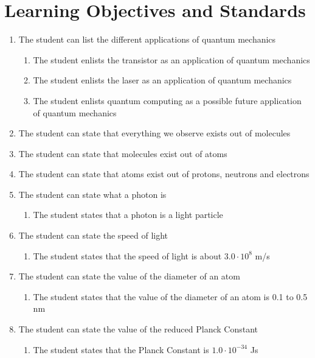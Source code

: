 \documentclass[11pt,twoside]{report} %
\begin{document}
\newpage

\section{Learning Objectives and Standards}
\label{app:objectivestandards}

\begin{enumerate}
\item The student can list the different applications of quantum mechanics
\begin{enumerate}
\item The student enlists the transistor as an application of quantum mechanics
\item The student enlists the laser as an application of quantum mechanics
\item The student enlists quantum computing as a possible future application of quantum mechanics
\end{enumerate}
\item \label{itm:molecules} The student can state that everything we observe exists out of molecules
\item The student can state that molecules exist out of atoms
\item The student can state that atoms exist out of protons, neutrons and electrons
\item The student can state what a photon is
\begin{enumerate}
\item The student states that a photon is a light particle
\end{enumerate}
\item The student can state the speed of light
\begin{enumerate}
\item The student states that the speed of light is about $3.0 \cdot 10 ^ 8$ m/s
\end{enumerate}
\item The student can state the value of the diameter of an atom
\begin{enumerate}
\item The student states that the value of the diameter of an atom is 0.1 to 0.5 nm
\end{enumerate}
\item \label{itm:planckconstant}The student can state the value of the reduced Planck Constant
\begin{enumerate}
\item The student states that the Planck Constant is $1.0 \cdot 10 ^ {-34}$ Js 

\end{enumerate}
\end{enumerate}
\end{document}
